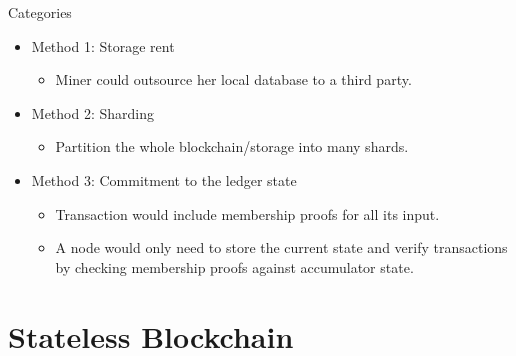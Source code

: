 \documentclass[biblatex,aspectratio=169,11pt]{mybeamer}
\begin{document}
\begin{frame}{Categories}
  \begin{itemize}
    \item Method 1: \alert{Storage rent}
     \begin{itemize}
       \item Miner could outsource her local database to a third party.
     \end{itemize}
    \item Method 2: \alert{Sharding}
     \begin{itemize}
       \item Partition the whole blockchain/storage into many shards.
     \end{itemize}
    \item Method 3: \alert{Commitment to the ledger state}
      \begin{itemize}
        \item Transaction would include membership proofs for all its input.
        \item A node would only need to store the current state and verify transactions by checking membership proofs against accumulator state.
      \end{itemize}
  \end{itemize}
\end{frame}

\section{Stateless Blockchain}

\subsection{}
\end{document}
